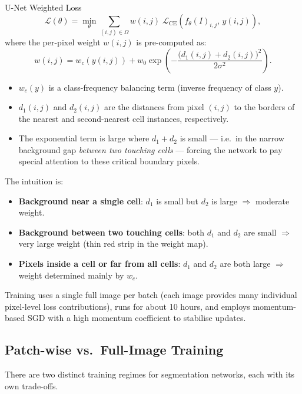 \documentclass[11pt,a4paper]{article}
\begin{document}
\begin{thmbox}{U-Net Weighted Loss}
\[
  \mathcal{L}(\theta) = \min_\theta \sum_{(i,j)\in\Omega} w(i,j)\; \mathcal{L}_{\text{CE}}\!\left(f_\theta(I)_{i,j},\, y(i,j)\right),
\]
where the per-pixel weight $w(i,j)$ is pre-computed as:
\[
  w(i,j) = w_c\!\left(y(i,j)\right) + w_0 \exp\!\left(-\frac{\bigl(d_1(i,j)+d_2(i,j)\bigr)^2}{2\sigma^2}\right).
\]
\begin{itemize}
  \item $w_c(y)$ is a class-frequency balancing term (inverse frequency of class $y$).
  \item $d_1(i,j)$ and $d_2(i,j)$ are the distances from pixel $(i,j)$ to the borders of the nearest and second-nearest cell instances, respectively.
  \item The exponential term is large where $d_1 + d_2$ is small — i.e.\ in the narrow background gap \emph{between two touching cells} — forcing the network to pay special attention to these critical boundary pixels.
\end{itemize}
\end{thmbox}

The intuition is:
\begin{itemize}
  \item \textbf{Background near a single cell}: $d_1$ is small but $d_2$ is large $\Rightarrow$ moderate weight.
  \item \textbf{Background between two touching cells}: both $d_1$ and $d_2$ are small $\Rightarrow$ very large weight (thin red strip in the weight map).
  \item \textbf{Pixels inside a cell or far from all cells}: $d_1$ and $d_2$ are both large $\Rightarrow$ weight determined mainly by $w_c$.
\end{itemize}

Training uses a single full image per batch (each image provides many individual pixel-level loss contributions), runs for about 10 hours, and employs momentum-based SGD with a high momentum coefficient to stabilise updates.

\subsection{Patch-wise vs.\ Full-Image Training}
\label{sec:training_modes}

There are two distinct training regimes for segmentation networks, each with its own trade-offs.
\end{document}
